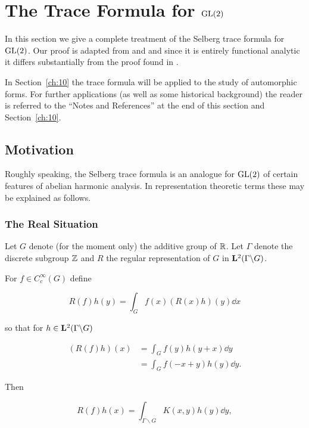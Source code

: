 \chapter{The Trace Formula for \texorpdfstring{$\operatorname{GL}(2)$}{GL(2)}}

\label{ch:9}

In this section we give a complete treatment of the Selberg trace formula for $\operatorname{GL}(2)$. Our proof is adapted from \cite{JacquetLanglands} and \cite{Arthur} and since it is entirely functional analytic it differs substantially from the proof found in \cite{DufloLabesse}.

In Section~\ref{ch:10} the trace formula will be applied to the study of automorphic forms. For further applications (as well as some historical background) the reader is referred to the ``Notes and References'' at the end of this section and Section~\ref{ch:10}.

\section{Motivation}\label{sec:9a}

Roughly speaking, the Selberg trace formula is an analogue for $\operatorname{GL}(2)$ of certain features of abelian harmonic analysis. In representation theoretic terms these may be explained as follows.

\subsection{The Real Situation}

Let $G$ denote (for the moment only) the additive group of $\mathbb{R}$. Let $\Gamma$ denote the discrete subgroup $\mathbb{Z}$ and $R$ the regular representation of $G$ in $\mathbf{L}^2(\Gamma \backslash G)$.

For $f \in C_c^\infty(G)$ define

\[
R(f)h(y) = \int_G f(x)(R(x)h)(y)\dd x
\]

so that for $h \in \mathbf{L}^2(\Gamma \backslash G)$

\[
\begin{aligned}
(R(f)h)(x) &= \int_G f(y)h(y + x)\dd y\\
&= \int_G f(-x + y)h(y)\dd y.
\end{aligned}
\]

Then

\begin{equation}\label{eq:9.1}
R(f)h(x) = \int_{\Gamma \backslash G} K(x, y)h(y)\dd y,\tag{9.1}
\end{equation}

